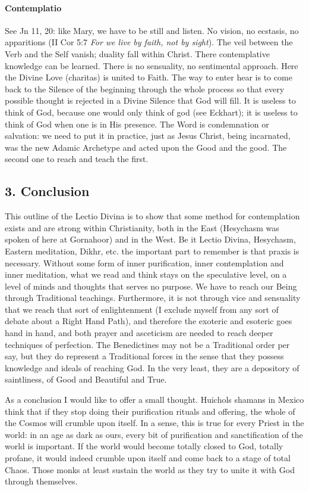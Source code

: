 \paragraph{Contemplatio}
See Jn 11, 20: like Mary, we have to be still and listen. No vision, no ecstasis, no apparitions (II Cor 5:7 \textit{For we live by faith, not by sight}). The veil between the Verb and the Self vanish; duality fall within Christ. There contemplative knowledge can be learned. There is no sensuality, no sentimental approach. Here the Divine Love (charitas) is united to Faith. The way to enter hear is to come back to the Silence of the beginning through the whole process so that every possible thought is rejected in a Divine Silence that God will fill. It is useless to think of God, because one would only think of god (see Eckhart); it is useless to think of God when one is in His presence. The Word is condemnation or salvation: we need to put it in practice, just as Jesus Christ, being incarnated, was the new Adamic Archetype and acted upon the Good and the good. The second one to reach and teach the first.

\subsection*{3. Conclusion}

This outline of the Lectio Divina is to show that some method for contemplation exists and are strong within Christianity, both in the East (Hesychasm was spoken of here at Gornahoor) and in the West. Be it Lectio Divina, Hesychasm, Eastern meditation, Dikhr, etc. the important part to remember is that praxis is necessary. Without some form of inner purification, inner contemplation and inner meditation, what we read and think stays on the speculative level, on a level of minds and thoughts that serves no purpose. We have to reach our Being through Traditional teachings. Furthermore, it is not through vice and sensuality that we reach that sort of enlightenment (I exclude myself from any sort of debate about a Right Hand Path), and therefore the exoteric and esoteric goes hand in hand, and both prayer and asceticism are needed to reach deeper techniques of perfection. The Benedictines may not be a Traditional order per say, but they do represent a Traditional forces in the sense that they possess knowledge and ideals of reaching God. In the very least, they are a depository of saintliness, of Good and Beautiful and True.

As a conclusion I would like to offer a small thought. Huichols shamans in Mexico think that if they stop doing their purification rituals and offering, the whole of the Cosmos will crumble upon itself. In a sense, this is true for every Priest in the world: in an age as dark as ours, every bit of purification and sanctification of the world is important. If the world would become totally closed to God, totally profane, it would indeed crumble upon itself and come back to a stage of total Chaos. Those monks at least sustain the world as they try to unite it with God through themselves.


